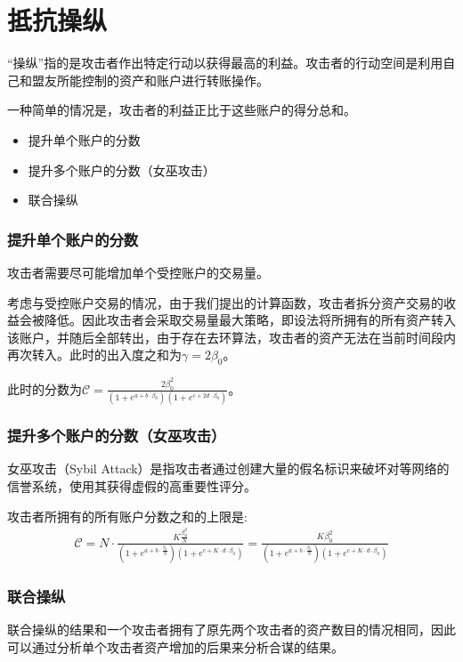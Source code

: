 \section{抵抗操纵}
\begin{frame}
“操纵”指的是攻击者作出特定行动以获得最高的利益。攻击者的行动空间是利用自己和盟友所能控制的资产和账户进行转账操作。


一种简单的情况是，攻击者的利益正比于这些账户的得分总和。

\begin{itemize}
\item 提升单个账户的分数
\item 提升多个账户的分数（女巫攻击）
\item 联合操纵
\end{itemize}

\end{frame}

\begin{frame}
\frametitle{提升单个账户的分数}
攻击者需要尽可能增加单个受控账户的交易量。%


考虑与受控账户交易的情况，由于我们提出的计算函数，攻击者拆分资产交易的收益会被降低。因此攻击者会采取交易量最大策略，即设法将所拥有的所有资产转入该账户，并随后全部转出，由于存在去环算法，攻击者的资产无法在当前时间段内再次转入。此时的出入度之和为$\gamma = 2 \beta_0$。

此时的分数为$\mathcal{C} =  \frac{2 \beta_0 ^2}{ (1+e^{a + b \cdot \beta_0}) (1+e^{c + 2 d \cdot \beta_0})}$。
\end{frame}


\begin{frame}
\frametitle{提升多个账户的分数（女巫攻击）}
女巫攻击（Sybil Attack）是指攻击者通过创建大量的假名标识来破坏对等网络的信誉系统，使用其获得虚假的高重要性评分。

攻击者所拥有的所有账户分数之和的上限是:
\begin{align}
\mathcal{C} = N \cdot \frac{K \frac{\beta_0 ^2}{N}}{ (1+e^{a + b \cdot \frac{\beta_0}{N} }) (1+e^{c + K \cdot d \cdot \beta_0})} = \frac{K \beta_0 ^2 }{ (1+e^{a + b \cdot \frac{\beta_0}{N} }) (1+e^{c + K \cdot d \cdot \beta_0})} 
\end{align}
\end{frame}


\begin{frame}
\frametitle{联合操纵}
联合操纵的结果和一个攻击者拥有了原先两个攻击者的资产数目的情况相同，因此可以通过分析单个攻击者资产增加的后果来分析合谋的结果。
\end{frame}